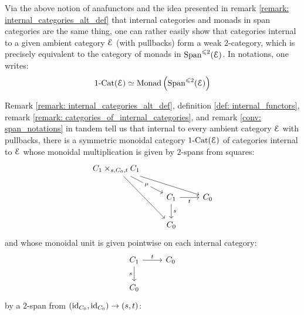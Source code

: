             \begin{remark} \label{remark: categories_of_internal_categories}
                Via the above notion of anafunctors and the idea presented in remark \ref{remark: internal_categories_alt_def} that internal categories and monads in span categories are the same thing, one can rather easily show that categories internal to a given ambient category $\E$ (with pullbacks) form a weak $2$-category, which is precisely equivalent to the category of monads in $\Span^{\leq 2}(\E)$. In notations, one writes:
                    $$1\-\Cat(\E) \cong \Monad\left(\Span^{\leq 2}(\E)\right)$$
            \end{remark}
            \begin{remark} \label{remark: categories_as_monoids}
                Remark \ref{remark: internal_categories_alt_def}, definition \ref{def: internal_functors}, remark \ref{remark: categories_of_internal_categories}, and remark \ref{conv: span_notations} in tandem tell us that internal to every ambient category $\E$ with pullbacks, there is a symmetric monoidal category $1\-\Cat(\E)$ of categories internal to $\E$ whose monoidal multiplication is given by $2$-spans from squares:
                    $$
                        \begin{tikzcd}
                        	{C_1 \x_{s, C_0, t} C_1} \\
                        	& {C_1} & {C_0} \\
                        	& {C_0}
                        	\arrow["s", from=2-2, to=3-2]
                        	\arrow["t"', from=2-2, to=2-3]
                        	\arrow[from=1-1, to=3-2]
                        	\arrow[from=1-1, to=2-3]
                        	\arrow["\mu"{description}, from=1-1, to=2-2]
                        \end{tikzcd}
                    $$
                and whose monoidal unit is given pointwise on each internal category:
                    $$
                        \begin{tikzcd}
                        	{C_1} & {C_0} \\
                        	{C_0}
                        	\arrow["s"', from=1-1, to=2-1]
                        	\arrow["t", from=1-1, to=1-2]
                        \end{tikzcd}
                    $$
                by a $2$-span from $(\id_{C_0}, \id_{C_0}) \to (s,t)$:
                    $$
                        \begin{tikzcd}

\end{tikzcd}$$
\end{remark}
